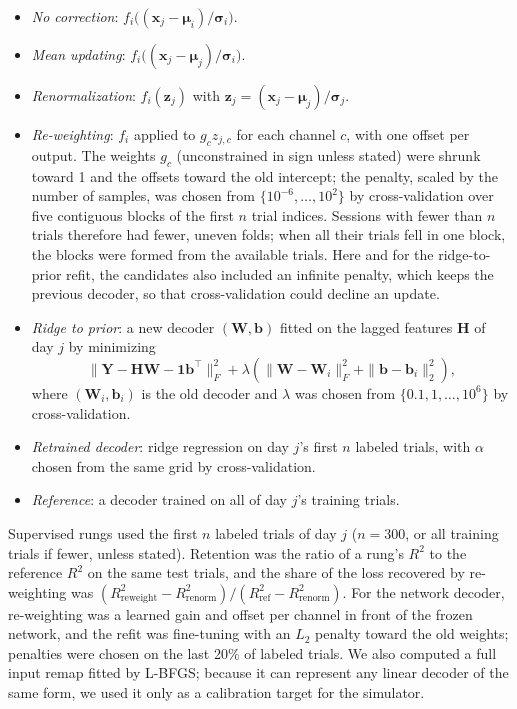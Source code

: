 \documentclass[pdflatex,sn-nature]{sn-jnl}
\begin{document}
\begin{itemize}
\item \textit{No correction}: $f_i\big((\mathbf{x}_j - \boldsymbol{\mu}_i)/\boldsymbol{\sigma}_i\big)$.
\item \textit{Mean updating}: $f_i\big((\mathbf{x}_j - \boldsymbol{\mu}_j)/\boldsymbol{\sigma}_i\big)$.
\item \textit{Renormalization}: $f_i(\mathbf{z}_j)$ with $\mathbf{z}_j = (\mathbf{x}_j - \boldsymbol{\mu}_j)/
\boldsymbol{\sigma}_j$.
\item \textit{Re-weighting}: $f_i$ applied to $g_c z_{j,c}$ for each channel $c$, with one offset per output. The weights
$g_c$ (unconstrained in sign unless stated) were shrunk toward 1 and the offsets toward the old intercept; the penalty,
scaled by the number of samples, was chosen from $\{10^{-6}, \ldots, 10^2\}$ by cross-validation over five contiguous
blocks of the first $n$ trial indices. Sessions with fewer than $n$ trials therefore had fewer, uneven folds; when all
their trials fell in one block, the blocks were formed from the available trials. Here and for the ridge-to-prior refit, the candidates also included an infinite penalty, which keeps
the previous decoder, so that cross-validation could decline an update.
\item \textit{Ridge to prior}: a new decoder $(\mathbf{W}, \mathbf{b})$ fitted on the lagged features $\mathbf{H}$ of day
$j$ by minimizing
\begin{equation}
\|\mathbf{Y} - \mathbf{H}\mathbf{W} - \mathbf{1}\mathbf{b}^\top\|_F^2 + \lambda\left(\|\mathbf{W} - \mathbf{W}_i\|_F^2
+ \|\mathbf{b} - \mathbf{b}_i\|_2^2\right),
\label{eq:prior}
\end{equation}
where $(\mathbf{W}_i, \mathbf{b}_i)$ is the old decoder and $\lambda$ was chosen from $\{0.1, 1, \ldots, 10^6\}$ by
cross-validation.
\item \textit{Retrained decoder}: ridge regression on day $j$'s first $n$ labeled trials, with $\alpha$ chosen from the same
grid by cross-validation.
\item \textit{Reference}: a decoder trained on all of day $j$'s training trials.
\end{itemize}

\noindent Supervised rungs used the first $n$ labeled trials of day $j$ ($n = 300$, or all training trials if fewer,
unless stated). Retention was the ratio of a rung's $R^2$ to the reference $R^2$ on the same test trials, and the share
of the loss recovered by re-weighting was $(R^2_{\text{reweight}} - R^2_{\text{renorm}})/(R^2_{\text{ref}} -
R^2_{\text{renorm}})$. For the network decoder, re-weighting was a learned gain and offset per channel in front of the
frozen network, and the refit was fine-tuning with an $L_2$ penalty toward the old weights; penalties were chosen on the
last 20\% of labeled trials. We also computed a full input remap fitted by L-BFGS\cite{liu1989}; because it can represent
any linear decoder of the same form, we used it only as a calibration target for the simulator.
\end{document}
